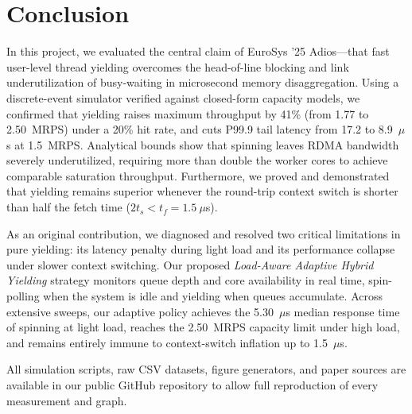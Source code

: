 \section{Conclusion}
\label{sec:conclusion}
In this project, we evaluated the central claim of EuroSys '25 Adios---that fast user-level thread yielding overcomes the head-of-line blocking and link underutilization of busy-waiting in microsecond memory disaggregation. Using a discrete-event simulator verified against closed-form capacity models, we confirmed that yielding raises maximum throughput by 41\% (from 1.77 to 2.50~MRPS) under a 20\% hit rate, and cuts P99.9 tail latency from 17.2 to 8.9~$\mu$s at 1.5~MRPS. Analytical bounds show that spinning leaves RDMA bandwidth severely underutilized, requiring more than double the worker cores to achieve comparable saturation throughput. Furthermore, we proved and demonstrated that yielding remains superior whenever the round-trip context switch is shorter than half the fetch time ($2t_s < t_f = 1.5~\mu$s).

As an original contribution, we diagnosed and resolved two critical limitations in pure yielding: its latency penalty during light load and its performance collapse under slower context switching. Our proposed \emph{Load-Aware Adaptive Hybrid Yielding} strategy monitors queue depth and core availability in real time, spin-polling when the system is idle and yielding when queues accumulate. Across extensive sweeps, our adaptive policy achieves the 5.30~$\mu$s median response time of spinning at light load, reaches the 2.50~MRPS capacity limit under high load, and remains entirely immune to context-switch inflation up to 1.5~$\mu$s.

All simulation scripts, raw CSV datasets, figure generators, and paper sources are available in our public GitHub repository to allow full reproduction of every measurement and graph.

